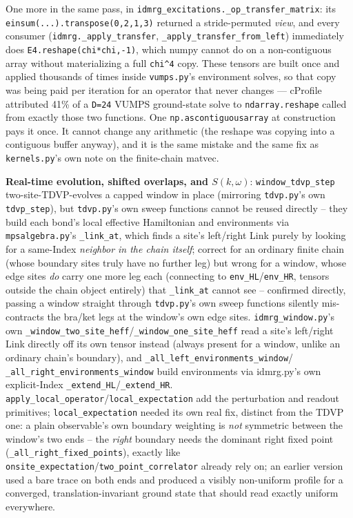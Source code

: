 \documentclass[11pt]{article}
\begin{document}
One more in the same pass, in
\texttt{idmrg\_excitations.\_op\_transfer\_matrix}: its
\texttt{einsum(...).transpose(0,2,1,3)} returned a stride-permuted
\emph{view}, and every consumer (\texttt{idmrg.\_apply\_transfer},
\texttt{\_apply\_transfer\_from\_left}) immediately does
\texttt{E4.reshape(chi*chi,-1)}, which numpy cannot do on a
non-contiguous array without materializing a full \texttt{chi\^{}4} copy.
These tensors are built once and applied thousands of times inside
\texttt{vumps.py}'s environment solves, so that copy was being paid per
iteration for an operator that never changes --- cProfile attributed
41\% of a \texttt{D=24} VUMPS ground-state solve to
\texttt{ndarray.reshape} called from exactly those two functions. One
\texttt{np.ascontiguousarray} at construction pays it once. It cannot
change any arithmetic (the reshape was copying into a contiguous buffer
anyway), and it is the same mistake and the same fix as
\texttt{kernels.py}'s own note on the finite-chain matvec.

\textbf{Real-time evolution, shifted overlaps, and $S(k,\omega)$}:
\texttt{window\_tdvp\_step} two-site-TDVP-evolves a capped window in
place (mirroring \texttt{tdvp.py}'s own \texttt{tdvp\_step}), but
\texttt{tdvp.py}'s own sweep functions cannot be reused directly --
they build each bond's local effective Hamiltonian and environments via
\texttt{mpsalgebra.py}'s \texttt{\_link\_at}, which finds a site's
left/right Link purely by looking for a same-Index \emph{neighbor in
the chain itself}; correct for an ordinary finite chain (whose boundary
sites truly have no further leg) but wrong for a window, whose edge
sites \emph{do} carry one more leg each (connecting to
\texttt{env\_HL}/\texttt{env\_HR}, tensors outside the chain object
entirely) that \texttt{\_link\_at} cannot see -- confirmed directly,
passing a window straight through \texttt{tdvp.py}'s own sweep
functions silently mis-contracts the bra/ket legs at the window's own
edge sites. \texttt{idmrg\_window.py}'s own
\texttt{\_window\_two\_site\_heff}/\texttt{\_window\_one\_site\_heff}
read a site's left/right Link directly off its own tensor instead
(always present for a window, unlike an ordinary chain's boundary), and
\texttt{\_all\_left\_environments\_window}/
\texttt{\_all\_right\_environments\_window} build environments via
idmrg.py's own explicit-Index \texttt{\_extend\_HL}/\texttt{\_extend\_HR}.
\texttt{apply\_local\_operator}/\texttt{local\_expectation} add the
perturbation and readout primitives; \texttt{local\_expectation} needed
its own real fix, distinct from the TDVP one: a plain observable's own
boundary weighting is \emph{not} symmetric between the window's two
ends -- the \emph{right} boundary needs the dominant right fixed
point (\texttt{\_all\_right\_fixed\_points}), exactly like
\texttt{onsite\_expectation}/\texttt{two\_point\_correlator} already
rely on; an earlier version used a bare trace on both ends and produced
a visibly non-uniform profile for a converged, translation-invariant
ground state that should read exactly uniform everywhere.
\end{document}
